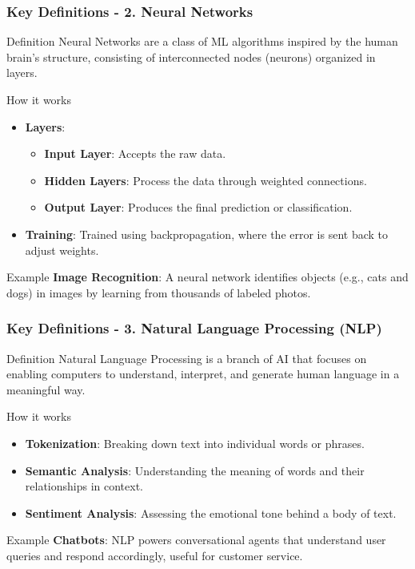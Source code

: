 \documentclass[aspectratio=169]{beamer}
\begin{document}
\begin{frame}[fragile]
    \frametitle{Key Definitions - 2. Neural Networks}
    \begin{block}{Definition}
        Neural Networks are a class of ML algorithms inspired by the human brain's structure, consisting of interconnected nodes (neurons) organized in layers.
    \end{block}

    \begin{block}{How it works}
        \begin{itemize}
            \item \textbf{Layers}:
            \begin{itemize}
                \item \textbf{Input Layer}: Accepts the raw data.
                \item \textbf{Hidden Layers}: Process the data through weighted connections.
                \item \textbf{Output Layer}: Produces the final prediction or classification.
            \end{itemize}
            \item \textbf{Training}: Trained using backpropagation, where the error is sent back to adjust weights.
        \end{itemize}
    \end{block}

    \begin{block}{Example}
        \textbf{Image Recognition}: A neural network identifies objects (e.g., cats and dogs) in images by learning from thousands of labeled photos.
    \end{block}
\end{frame}

\begin{frame}[fragile]
    \frametitle{Key Definitions - 3. Natural Language Processing (NLP)}
    \begin{block}{Definition}
        Natural Language Processing is a branch of AI that focuses on enabling computers to understand, interpret, and generate human language in a meaningful way.
    \end{block}

    \begin{block}{How it works}
        \begin{itemize}
            \item \textbf{Tokenization}: Breaking down text into individual words or phrases.
            \item \textbf{Semantic Analysis}: Understanding the meaning of words and their relationships in context.
            \item \textbf{Sentiment Analysis}: Assessing the emotional tone behind a body of text.
        \end{itemize}
    \end{block}

    \begin{block}{Example}
        \textbf{Chatbots}: NLP powers conversational agents that understand user queries and respond accordingly, useful for customer service.
    \end{block}
\end{frame}
\end{document}
